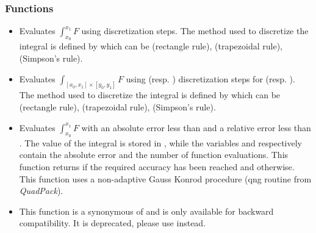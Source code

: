 \subsubsection{Functions}

\begin{itemize}
\item {}
  \sshortdescribe Evaluates $\int_{x_0}^{x_1} F$ using  discretization
  steps. The method used to discretize the integral is defined by 
  which can be  (rectangle rule),  (trapezoidal rule),
   (Simpson's rule).

\item {}
  \sshortdescribe Evaluates $\int_{[x_0, x_1] \times [y_0, y_1]} F$ using
   (resp. ) discretization steps for \var{[x0, x1]}
  (resp. \var{[y0, y1]}). The method used to discretize the integral is
  defined by  which can be  (rectangle rule),
   (trapezoidal rule),    (Simpson's rule).


\item {}
  \sshortdescribe Evaluates $\int_{x_0}^{x_1} F$ with an absolute error less
  than  and a relative error less than . The value of
  the integral is stored in , while the variables  and
   respectively contain the absolute error and the number of function
  evaluations. This function returns  if the required accuracy has been
  reached and  otherwise. This function uses a non-adaptive Gauss
  Konrod procedure (qng routine from {\it QuadPack}).

\item {}
  \sshortdescribe This function is a synonymous of
   and is only available for backward
  compatibility. It is deprecated, please use 
  instead.


\end{itemize}
